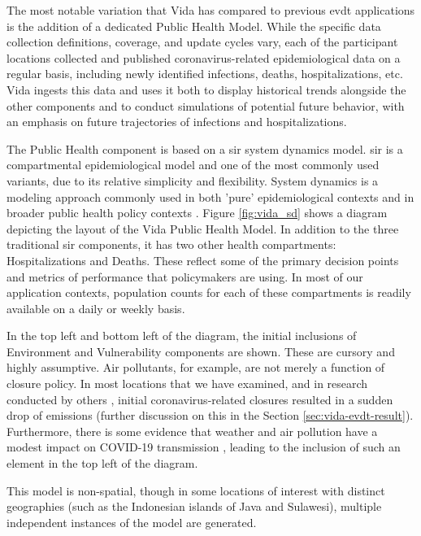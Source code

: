 The most notable variation that Vida has compared to previous \ac{evdt} applications is the addition of a dedicated Public Health Model. While the specific data collection definitions, coverage, and update cycles vary, each of the participant locations collected and published coronavirus-related epidemiological data on a regular basis, including newly identified infections, deaths, hospitalizations, etc. Vida ingests this data and uses it both to display historical trends alongside the other components and to conduct simulations of potential future behavior, with an emphasis on future trajectories of infections and hospitalizations. 

The Public Health component is based on a \ac{sir} system dynamics model. \ac{sir} is a compartmental epidemiological model and one of the most commonly used variants, due to its relative simplicity and flexibility. System dynamics is a modeling approach commonly used in both 'pure' epidemiological contexts \cite{homerSystemDynamicsModeling2006} and in broader public health policy contexts \cite{deutschCommunitybasedSystemDynamics2020}. Figure \ref{fig:vida_sd} shows a diagram depicting the layout of the Vida Public Health Model. In addition to the three traditional \ac{sir} components, it has two other health compartments: Hospitalizations and Deaths. These reflect some of the primary decision points and metrics of performance that policymakers are using. In most of our application contexts, population counts for each of these compartments is readily available on a daily or weekly basis. 

In the top left and bottom left of the diagram, the initial inclusions of Environment and Vulnerability components are shown. These are cursory and highly assumptive. Air pollutants, for example, are not merely a function of closure policy. In most locations that we have examined, and in research conducted by others \cite{isaifanDramaticImpactCoronavirus2020}, initial coronavirus-related closures resulted in a sudden drop of emissions (further discussion on this in the Section \ref{sec:vida-evdt-result}). Furthermore, there is some evidence that weather and air pollution have a modest impact on COVID-19 transmission \cite{xuModestImpactWeather2020}, leading to the inclusion of such an element in the top left of the diagram.

This model is non-spatial, though in some locations of interest with distinct geographies (such as the Indonesian islands of Java and Sulawesi), multiple independent instances of the model are generated.

